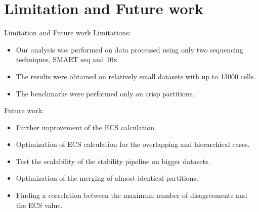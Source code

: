 \section{Limitation and Future work}

\begin{frame}{Limitation and Future work}
Limitations:
\begin{itemize}
    \item Our analysis was performed on data processed using only two sequencing techniques, SMART seq and 10x.
    \item The results were obtained on relatively small datasets with up to 13000 cells.
    \item The benchmarks were performed only on crisp partitions.
\end{itemize}
\bigskip
Future work:
\begin{itemize}
    \item Further improvement of the ECS calculation.
    \item Optimization of ECS calculation for the overlapping and hierarchical cases.
    \item Test the scalability of the stability pipeline on bigger datasets.
    \item Optimization of the merging of almost identical partitions.
    \item Finding a correlation between the maximum number of disagreements and the ECS value.
\end{itemize}
    
\end{frame}